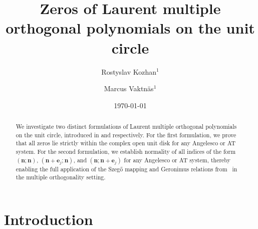 \documentclass[reqno,centertags,11pt,draft]{amsart}
\begin{document}
\title{Zeros of Laurent multiple orthogonal polynomials on the unit circle %
}
\author{Rostyslav Kozhan$^1$}
\author{Marcus Vaktnäs$^{1}$}
\address{$^{1}$Department of Mathematics, Uppsala University, S-751 06 Uppsala, Sweden}
\date{\today}
\begin{abstract}
    We investigate two distinct formulations of Laurent multiple orthogonal polynomials on the unit circle, introduced in \cite{KVMLOPUC} and \cite{KVHP} respectively.
    For the first formulation, we prove that all zeros lie strictly within the complex open unit disk for any Angelesco or AT system. For the second formulation, we establish normality
    of all indices of the form $(\bm{n};\bm{n})$, $(\bm{n}+\bm{e}_j;\bm{n})$, and $(\bm{n};\bm{n}+\bm{e}_j)$  for any Angelesco or AT system, thereby enabling the full application of the Szeg\H{o} mapping and Geronimus relations from~\cite{KVHP} in the multiple orthogonality setting.
 
\end{abstract}
\maketitle


\section{Introduction}
\end{document}
